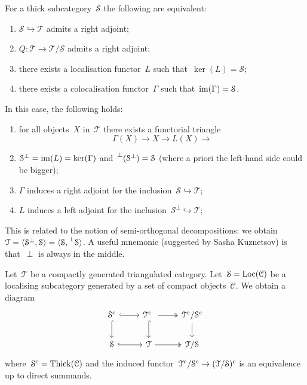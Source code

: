 \documentclass[10pt,a4paper]{article}
\begin{document}
\begin{proposition}
  For a thick subcategory~$\mathcal{S}$ the following are equivalent:
  \begin{enumerate}
    \item $\mathcal{S}\hookrightarrow\mathcal{T}$ admits a right adjoint;
    \item $Q\colon\mathcal{T}\to\mathcal{T}/\mathcal{S}$ admits a right adjoint;
    \item there exists a localisation functor~$L$ such that~$\ker(L)=\mathcal{S}$;
    \item there exists a colocalisation functor~$\Gamma$ such that~$\operatorname{im}(\Gamma)=\mathcal{S}$.
  \end{enumerate}
\end{proposition}
In this case, the following holds:
\begin{enumerate}
  \item for all objects~$X$ in~$\mathcal{T}$ there exists a functorial triangle
    \begin{equation}
      \Gamma(X)\to X\to L(X)\to
    \end{equation}
  \item $\mathcal{S}^\perp=\operatorname{im}(L)=\ker(\Gamma)$ and~$\prescript{\perp}{}{(}\mathcal{S}^\perp)=\mathcal{S}$ (where a priori the left-hand side could be bigger);
  \item $\Gamma$ induces a right adjoint for the inclusion~$\mathcal{S}\hookrightarrow\mathcal{T}$;
  \item $L$ induces a left adjoint for the inclusion~$\mathcal{S}^\perp\hookrightarrow\mathcal{T}$;
\end{enumerate}
\begin{remark}
  This is related to the notion of semi-orthogonal decompositions: we obtain~$\mathcal{T}=\langle\mathcal{S}^\perp,\mathcal{S}\rangle=\langle\mathcal{S},\prescript{\perp}{}{\mathcal{S}}\rangle$. A useful mnemonic (suggested by Sasha Kuznetsov) is that~$\perp$ is always in the middle.
\end{remark}
\begin{example}
  Let~$\mathcal{T}$ be a compactly generated triangulated category. Let~$\mathcal{S}=\operatorname{Loc}(\mathcal{C})$ be a localising subcategory generated by a set of compact objects~$\mathcal{C}$. We obtain a diagram
  \begin{equation}
    \begin{tikzcd}
      \mathcal{S}^\cc \arrow[hook]{r} \arrow[hook]{d} & \mathcal{T}^\cc \arrow[two heads]{r} \arrow[hook]{d} & \mathcal{T}^\cc/\mathcal{S}^\cc \arrow{d} \\
      \mathcal{S} \arrow[hook]{r} & \mathcal{T} \arrow[two heads]{r} & \mathcal{T}/\mathcal{S}
    \end{tikzcd}
  \end{equation}
  where~$\mathcal{S}^{\mathrm{c}}=\operatorname{Thick}(\mathcal{C})$ and the induced functor~$\mathcal{T}^{\mathrm{c}}/\mathcal{S}^{\mathrm{c}}\to(\mathcal{T}/\mathcal{S})^{\mathrm{c}}$ is an equivalence up to direct summands.
\end{example}
\end{document}
